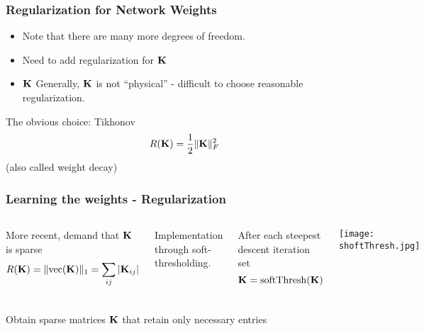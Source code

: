 \documentclass[12pt,fleqn,handout]{beamer}
\begin{document}
\begin{frame}[fragile]\frametitle{Regularization for Network Weights}

\begin{itemize}
\item
Note that there are many more degrees of freedom.
\item
Need to add regularization for ${\bf K}$
\item
${\bf K}$ Generally, ${\bf K}$ is not ``physical'' - difficult to choose reasonable
regularization.
\end{itemize}

\bigskip

The obvious choice: Tikhonov
$$ R({\bf K}) = {\frac 12} \|{\bf K}\|^2_F $$
(also called weight decay)


\end{frame}

\begin{frame}[fragile]\frametitle{Learning the weights - Regularization}

\begin{columns}
More recent, demand that ${\bf K}$ is sparse
$$ R({\bf K}) = \|{\rm vec}({\bf K})\|_1 = \sum_{ij} |{\bf K}_{ij}| $$

\bigskip

Implementation through soft-thresholding.


After each steepest descent iteration set
$$ {\bf K} = {\rm softThresh}({\bf K}) $$
	
	\begin{center}
	\texttt{[image: shoftThresh.jpg]}
	\end{center}
	
\end{columns}

\vspace{10mm}
\begin{center}
Obtain sparse matrices ${\bf K}$ that retain only necessary entries
	
\end{center}

\end{frame}




%
%
%
%
%
%
\end{document}
